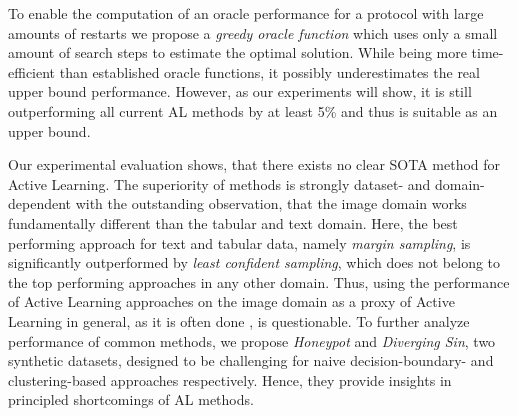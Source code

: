 \documentclass[]{article}
\begin{document}
To enable the computation of an oracle performance for a protocol with large amounts of restarts
we propose a \emph{greedy oracle function} 
which uses only a small amount of search steps to estimate the
optimal solution. While being more time-efficient than established oracle
functions, it possibly underestimates the real upper bound performance. 
However, as our experiments will show, it is still outperforming all current AL methods
by at least 5\% and thus is suitable as an upper bound.

Our experimental evaluation shows, that there exists no clear SOTA
method for Active Learning. The superiority of methods is strongly dataset- and
domain-dependent with the outstanding observation, that the image domain works
fundamentally different than the tabular and text domain. Here, the best
performing approach for text and tabular data, namely \emph{margin sampling}, is
significantly outperformed by \emph{least confident sampling}, which does not belong to
the top performing approaches in any other domain. Thus, using the performance
of Active Learning approaches on the image domain as a proxy of Active Learning
in general, as it is often done \cite{beck2021effective, munjal2022towards, li2022empirical, ji2023randomness, luth2024navigating}, is questionable. To further analyze
performance of common methods, we propose \emph{Honeypot} and \emph{Diverging Sin}, two
synthetic datasets, designed to be challenging for naive decision-boundary- and clustering-based approaches respectively. Hence, they provide insights in principled shortcomings of AL methods.
\end{document}
